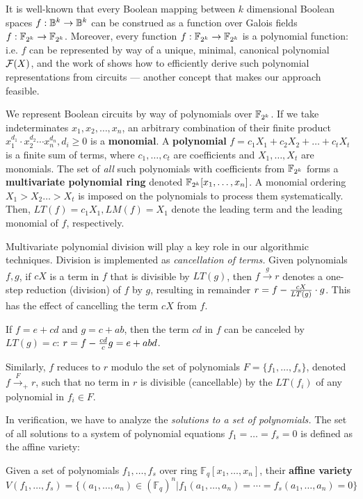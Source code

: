 It is well-known that every Boolean mapping between $k$ dimensional
Boolean spaces $f: {\mathbb{B}}^k \rightarrow {\mathbb{B}}^k$ can be construed as a
function over Galois fields $f: {\mathbb{F}}_{2^k} \rightarrow {\mathbb{F}}_{2^k}$. Moreover,
every function $f: {\mathbb{F}}_{2^k} \rightarrow {\mathbb{F}}_{2^k}$ is a polynomial function: 
i.e. $f$ can be represented by way of a unique, minimal, canonical
polynomial ${\mathcal{F}}(X)$, and the work of \cite{timDAC} shows how to
efficiently derive such polynomial representations from circuits ---
another concept that makes our approach feasible. 


We represent Boolean circuits by way of polynomials over
${\mathbb{F}}_{2^k}$. If we take indeterminates $x_1,x_2,\dots,x_n$, an arbitrary
combination of their finite product  
$x_1^{d_1}\cdot x_2^{d_2}\cdots x_n^{d_n}, d_i\geq 0$ 
is a {\bf monomial}. A {\bf polynomial} $f = c_1 X_1 + c_2 X_2 + \dots
+ c_t X_t$ is a finite sum of terms, where $c_1, \dots, c_t$ are
coefficients and $X_1, \dots, X_t$ are monomials. The set of {\it all}
such polynomials with coefficients from ${\mathbb{F}}_{2^k}$ forms a {\bf
  multivariate polynomial ring} denoted ${\mathbb{F}}_{2^k}[x_1,\dots,x_n]$. 
A monomial ordering $X_1 > X_2 \dots > X_t$ is imposed on the
polynomials to process them systematically. Then, $LT(f) = c_1 X_1,
LM(f) = X_1$ denote the leading term and the leading monomial of $f$,
respectively. 


Multivariate polynomial division will play a key role in our
algorithmic techniques. Division is implemented as {\it cancellation
  of terms.} Given polynomials $f, g$, if $cX$ is a term in
$f$ that is divisible by $LT(g)$, then $f \xrightarrow{g} r$ denotes a
one-step reduction (division) of $f$ by $g$, resulting in remainder $r
= f - {{cX} \over {LT(g)}} \cdot g$. This has the effect of cancelling
the term $cX$ from $f$. 
\begin{Example}
\label{ex:multidiv}
If $f = e + cd$ and $g = c + ab$,
then the term $cd$ in $f$ can be canceled by $LT(g) = c$: $r = f - {cd
  \over c} g = e + abd$. 
\end{Example}
  Similarly, $f$ reduces to $r$ modulo the set
of polynomials $F = \{f_1, \dots, f_s\}$, denoted $f \stackrel{F}
{\textstyle   \longrightarrow}_+ r$, such that no term in $r$ is
divisible (cancellable) by the $LT(f_i)$ of any polynomial in $ f_i
\in F$.    


In verification, we have to analyze the {\it solutions to a
set of polynomials.} The set of all solutions to a system of
polynomial equations $f_1 = \dots = f_s = 0$ is defined as the affine variety:
\begin{Definition}
Given a set of polynomials $f_1,\dots,f_s$ over ring $\mathbb F_q[x_1,\dots,x_n]$, their 
{\bf affine variety} 
$$V(f_1,\dots,f_s) = \{(a_1,\dots,a_n)\in  (\mathbb F_q)^n |
f_1(a_1,\dots,a_n) = \cdots = f_s(a_1,\dots,a_n) = 0\}$$ 
\end{Definition}

